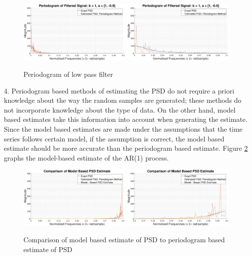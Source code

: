 \documentclass{article}
\begin{document}
\begin{figure}[H]
    \centering
    \includegraphics[width=0.49\textwidth]{ar_1_process_estimate_and_ideal_2}
    \includegraphics[width=0.49\textwidth]{ar_1_process_estimate_and_ideal_2_zoom}
    \caption{Periodogram of low pass filter}
    \label{fig:ar_1_periodogram_2}
\end{figure}

4. Periodogram based methods of estimating the PSD do not require a priori knowledge about the way the random samples are generated; these methods do not incorporate knowledge about the type of data. On the other hand, model based estimates take this information into account when generating the estimate. Since the model based estimates are made under the assumptions that the time series follows certain model, if the assumption is correct, the model based estimate should be more accurate than the periodogram based estimate. Figure \ref{fig:model_based_estimate} graphs the model-based estimate of the AR(1) process.

\begin{figure}[H]
    \centering
    \includegraphics[width=0.49\textwidth]{model_based_psd}
    \includegraphics[width=0.49\textwidth]{model_based_psd_zoom}
    \caption{Comparison of model based estimate of PSD to periodogram based estimate of PSD}
    \label{fig:model_based_estimate}
\end{figure}
\end{document}
